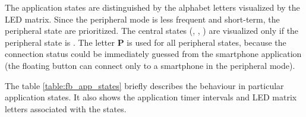             The application states are distinguished by the alphabet letters visualized by the LED matrix. Since the peripheral mode is less frequent and short-term, the peripheral state are prioritized. The central states (, , ) are visualized only if the peripheral state is . The letter \textbf{\large P} is used for all peripheral states, because the connection status could be immediately guessed from the smartphone application (the floating button can connect only to a smartphone in the peripheral mode).
            
            The table \ref{table:fb_app_states} briefly describes the behaviour in particular application states. It also shows the application timer intervals and LED matrix letters associated with the states.
        
            \begin{table}[!h]
                \caption{Application states of the floating button.}
                \label{table:fb_app_states}
            \end{table}
        
